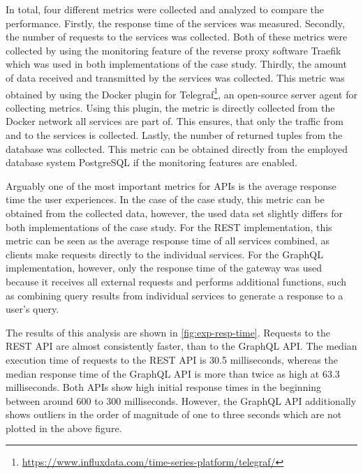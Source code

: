 In total, four different metrics were collected and analyzed to compare the performance.
Firstly, the response time of the services was measured.
Secondly, the number of requests to the services was collected.
Both of these metrics were collected by using the monitoring feature of the reverse proxy software Traefik which was used in both implementations of the case study.
Thirdly, the amount of data received and transmitted by the services was collected.
This metric was obtained by using the Docker plugin for Telegraf\footnote{\url{https://www.influxdata.com/time-series-platform/telegraf/}}, an open-source server agent for collecting metrics.
Using this plugin, the metric is directly collected from the Docker network all services are part of.
This ensures, that only the traffic from and to the services is collected.
Lastly, the number of returned tuples from the database was collected.
This metric can be obtained directly from the employed database system PostgreSQL if the monitoring features are enabled.

Arguably one of the most important metrics for \acp{API} is the average response time the user experiences.
In the case of the case study, this metric can be obtained from the collected data, however, the used data set slightly differs for both implementations of the case study.
For the \ac{REST} implementation, this metric can be seen as the average response time of all services combined, as clients make requests directly to the individual services.
For the GraphQL implementation, however, only the response time of the gateway was used because it receives all external requests and performs additional functions, such as combining query results from individual services to generate a response to a user's query.

The results of this analysis are shown in \autoref{fig:exp-resp-time}.
Requests to the \ac{REST} \ac{API} are almost consistently faster, than to the GraphQL \ac{API}.
The median execution time of requests to the \ac{REST} \ac{API} is 30.5 milliseconds, whereas the median response time of the GraphQL \ac{API} is more than twice as high at 63.3 milliseconds.
Both \acp{API} show high initial response times in the beginning between around 600 to 300 milliseconds.
However, the GraphQL \ac{API} additionally shows outliers in the order of magnitude of one to three seconds which are not plotted in the above figure.

